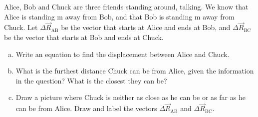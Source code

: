 \label{fnt6.1.2-2}

Alice, Bob and Chuck are three friends standing around, talking. We know that Alice is standing \unit[9]{m} away from Bob, and that Bob is standing \unit[3]{m} away from Chuck. Let $\Delta \vec{R}_\text{AB}$ be the vector that starts at Alice and ends at Bob, and $\Delta \vec{R}_\text{BC}$ be the vector that starts at Bob and ends at Chuck.

\begin{enumerate}[(a)]
	\item Write an equation to find the displacement between Alice and Chuck.
	
	\item What is the furthest distance Chuck can be from Alice, given the information in the question? What is the closest they can be?
	
	\item Draw a picture where Chuck is neither as close as he can be or as far as he can be from Alice. Draw and label the vectors $\Delta \vec{R}_\text{AB}$ and $\Delta \vec{R}_\text{BC}$. 
\end{enumerate}